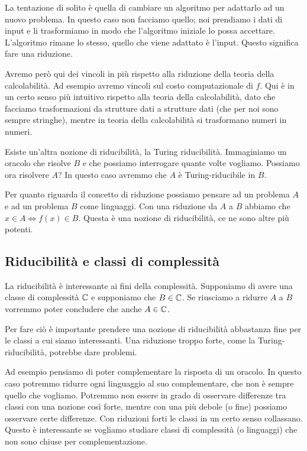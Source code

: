 La tentazione di solito è quella di cambiare un algoritmo per adattarlo ad un nuovo problema. In
questo caso non facciamo quello; noi prendiamo i dati di input e li trasformiamo in modo che
l'algoritmo iniziale lo possa accettare. L'algoritmo rimane lo stesso, quello che viene adattato è
l'input. Questo significa fare una riduzione.

Avremo però qui dei vincoli in più rispetto alla riduzione della teoria della calcolabilità. Ad
esempio avremo vincoli sul costo computazionale di $f$. Qui è in un certo senso più intuitivo
rispetto alla teoria della calcolabilità, dato che facciamo trasformazioni da strutture dati a
strutture dati (che per noi sono sempre stringhe), mentre in teoria della calcolabilità si
trasformano numeri in numeri.

Esiste un'altra nozione di riducibilità, la Turing riducibilità. Immaginiamo un oracolo che risolve
$B$ e che possiamo interrogare quante volte vogliamo. Possiamo ora risolvere $A$? In questo caso
avremmo che $A$ è Turing-riducibile in $B$.

Per quanto riguarda il concetto di riduzione possiamo pensare ad un problema $A$ e ad un problema
$B$ come linguaggi. Con una riduzione da $A$ a $B$ abbiamo che $x \in A \iff f(x) \in B$. Questa è una
nozione di riducibilità, ce ne sono altre più potenti.

\subsection{Riducibilità e classi di complessità}

La riducibilità è interessante ai fini della complessità. Supponiamo di avere una classe di
complessità $\mathbb{C}$ e supponiamo che $B \in \mathbb{C}$. Se riusciamo a ridurre $A$ a $B$ vorremmo
poter concludere che anche $A \in \mathbb{C}$.

Per fare ciò è importante prendere una nozione di riducibilità abbastanza fine per le classi a
cui siamo interessanti. Una riduzione troppo forte, come la Turing-riducibilità, potrebbe dare
problemi.

Ad esempio pensiamo di poter complementare la risposta di un oracolo. In questo caso potremmo
ridurre ogni linguaggio al suo complementare, che non è sempre quello che vogliamo. Potremmo non
essere in grado di osservare differenze tra classi con una nozione così forte, mentre con una più
debole (o fine) possiamo osservare certe differenze. Con riduzioni forti le classi in un certo senso
collassano. Questo è interessante se vogliamo studiare classi di complessità (o linguaggi) che non
sono chiuse per complementazione.


